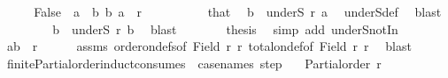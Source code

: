 \begin{isabellebody}
\ \ \isamarkupfalse%
\ \isamarkupfalse%
\ False\ \ {\isachardoublequoteopen}a\ {\isasymnoteq}\ b{\isachardoublequoteclose}\ {\isachardoublequoteopen}{\isacharparenleft}{\kern0pt}b{\isacharcomma}{\kern0pt}\ a{\isacharparenright}{\kern0pt}\ {\isasymin}\ r{\isachardoublequoteclose}\isanewline
\ \ \isamarkupfalse%
\ {\isacharminus}{\kern0pt}\isanewline
\ \ \ \ \isamarkupfalse%
\ that\ \isamarkupfalse%
\ {\isachardoublequoteopen}b\ {\isasymin}\ underS\ r\ a{\isachardoublequoteclose}\ \isamarkupfalse%
\ underS{\isacharunderscore}{\kern0pt}def\ \isamarkupfalse%
\ blast\isanewline
\ \ \ \ \isamarkupfalse%
\ {\isacharasterisk}{\kern0pt}\ \isamarkupfalse%
\ {\isachardoublequoteopen}b\ {\isasymin}\ underS\ r\ b{\isachardoublequoteclose}\ \isamarkupfalse%
\ blast\isanewline
\ \ \ \ \isamarkupfalse%
\ \isamarkupfalse%
\ {\isacharquery}{\kern0pt}thesis\ \isamarkupfalse%
\ {\isacharparenleft}{\kern0pt}simp\ add{\isacharcolon}{\kern0pt}\ underS{\isacharunderscore}{\kern0pt}notIn{\isacharparenright}{\kern0pt}\isanewline
\ \ \isamarkupfalse%
\isanewline
\ \ \isamarkupfalse%
\ \isamarkupfalse%
\ {\isachardoublequoteopen}{\isacharparenleft}{\kern0pt}a{\isacharcomma}{\kern0pt}b{\isacharparenright}{\kern0pt}\ {\isasymin}\ r{\isachardoublequoteclose}\isanewline
\ \ \ \ \isamarkupfalse%
\ assms\ order{\isacharunderscore}{\kern0pt}on{\isacharunderscore}{\kern0pt}defs{\isacharbrackleft}{\kern0pt}of\ {\isachardoublequoteopen}Field\ r{\isachardoublequoteclose}\ r{\isacharbrackright}{\kern0pt}\ total{\isacharunderscore}{\kern0pt}on{\isacharunderscore}{\kern0pt}def{\isacharbrackleft}{\kern0pt}of\ {\isachardoublequoteopen}Field\ r{\isachardoublequoteclose}\ r{\isacharbrackright}{\kern0pt}\ \isamarkupfalse%
\ blast\isanewline
{}\isamarkupfalse%
%
\endisatagproof
{\isafoldproof}%
%
\isadelimproof
\isanewline
%
\endisadelimproof
\isanewline
{}\isamarkupfalse%
\ finite{\isacharunderscore}{\kern0pt}Partial{\isacharunderscore}{\kern0pt}order{\isacharunderscore}{\kern0pt}induct{\isacharbrackleft}{\kern0pt}consumes\ {}{\isacharcomma}{\kern0pt}\ case{\isacharunderscore}{\kern0pt}names\ step{\isacharbrackright}{\kern0pt}{\isacharcolon}{\kern0pt}\isanewline
\ \ \ {\isachardoublequoteopen}Partial{\isacharunderscore}{\kern0pt}order\ r{\isachardoublequoteclose}\isanewline

\end{isabellebody}
